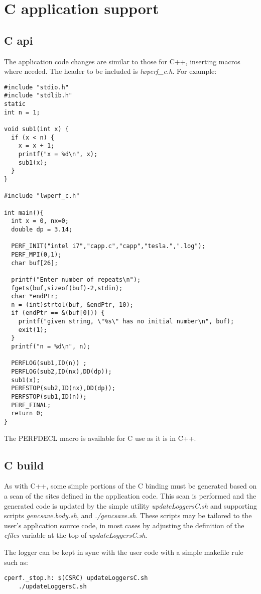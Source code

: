 \documentclass{article}
\begin{document}
\section{C application support}
\label{sec:langC}

\subsection{C api}
\label{sec:capi}
The application code changes are similar to those for C++, inserting macros where needed. The header to be included is {\em lwperf\_c.h}. For example:
\begin{verbatim}
#include "stdio.h"
#include "stdlib.h"
static
int n = 1;

void sub1(int x) {
  if (x < n) {
    x = x + 1;
    printf("x = %d\n", x);
    sub1(x);
  }
}

#include "lwperf_c.h"

int main(){
  int x = 0, nx=0;
  double dp = 3.14;

  PERF_INIT("intel i7","capp.c","capp","tesla.",".log");
  PERF_MPI(0,1);
  char buf[26];

  printf("Enter number of repeats\n");
  fgets(buf,sizeof(buf)-2,stdin);
  char *endPtr;
  n = (int)strtol(buf, &endPtr, 10);
  if (endPtr == &(buf[0])) {
    printf("given string, \"%s\" has no initial number\n", buf);
    exit(1);
  }
  printf("n = %d\n", n);

  PERFLOG(sub1,ID(n)) ;
  PERFLOG(sub2,ID(nx),DD(dp));
  sub1(x);
  PERFSTOP(sub2,ID(nx),DD(dp));
  PERFSTOP(sub1,ID(n));
  PERF_FINAL;
  return 0;
}
\end{verbatim}

The PERFDECL macro is available for C use as it is in C++.

\subsection{C build}
\label{sec:cbuild}
As with C++, some simple portions of the C binding must be generated based on a scan of the sites defined in the application code. This scan is performed and the generated code is updated by the simple utility {\em updateLoggersC.sh} and supporting scripts {\em gencsave.body.sh}, and {\em ./gencsave.sh}. These scripts may be tailored to the user's application source code, in most cases by adjusting the definition of the {\em cfiles} variable at the top of {\em updateLoggersC.sh}.

The logger can be kept in sync with the user code with a simple makefile rule such as:
\begin{verbatim}
cperf._stop.h: $(CSRC) updateLoggersC.sh
	./updateLoggersC.sh
\end{verbatim}
\end{document}
